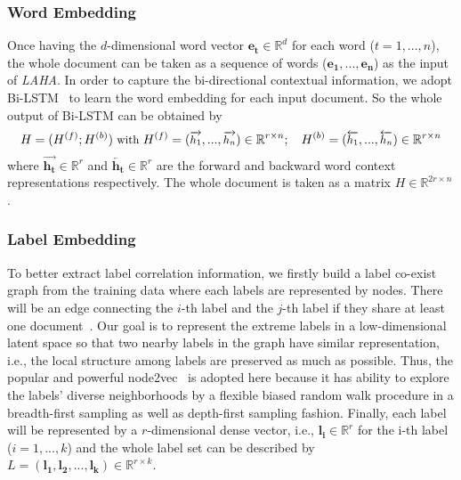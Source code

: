\documentclass[runningheads]{llncs}
\newenvironment{sequation}{\begin{equation}\small}{\end{equation}}
\begin{document}
\subsubsection{Word Embedding} 

Once having the $d$-dimensional word vector $\mathbf{{ e }_{ t }}\in { \mathbb{R} }^{ d }$ for each word ($t=1, ..., n$), the whole document can be taken as a sequence of words ($\mathbf{{ e }_1,...,e_n}$) as the input of \textit{LAHA}. In order to capture the bi-directional contextual information, we adopt Bi-LSTM~\cite{ref_article28} to learn the word embedding for each input document. So the whole output of Bi-LSTM can be obtained by 
\begin{sequation}
H = ({ H }^{ (f) };{ H }^{ (b) })  \text{ with } 
{ H }^{ (f) }=(\overrightarrow { { h }_{ 1 } } ,...,\overrightarrow { { h }_{ n } } ) \in { \mathbb{R} }^{ r \times n} ;\quad
{ H }^{ (b) }=(\overleftarrow { { h }_{ 1 } } ,...,\overleftarrow { { h }_{ n } } ) \in { \mathbb{R} }^{ r \times n}
\end{sequation}
where $\mathbf{\overrightarrow { { h }_{ t } }} \in { \mathbb{R} }^{ r }$ and $\mathbf{\overleftarrow { { h }_{ t } }} \in { \mathbb{R} }^{ r }$ are the forward and backward word context representations respectively.
The whole document is taken as a matrix $H\in { \mathbb{R} }^{ 2r \times n}$.



\vspace{-2mm}
\subsubsection{Label Embedding}




To better extract label correlation information, we firstly build a label co-exist graph from the training data where each labels are represented by nodes. There will be an edge connecting the $i$-th label and the $j$-th label if they share at least one document~\cite{ref_article15}. Our goal is to represent the extreme labels in a low-dimensional latent space so that two nearby labels in the graph have similar representation, i.e., the local structure among labels are preserved as much as possible. Thus, the popular and powerful node2vec~\cite{ref_article17} is adopted here because it has ability to explore the labels' diverse neighborhoods by a flexible biased random walk procedure in a breadth-first sampling as well as depth-first sampling fashion. Finally, each label will be represented by a $r$-dimensional dense vector, i.e., $\mathbf{{ l }_{ i }}\in { \mathbb{R} }^{ r }$ for the i-th label ($i=1, ..., k$) and the whole label set can be described by $L=(\mathbf{{ l }_{ 1 },{ l }_{ 2 }, ..., { l }_{ k }}) \in \mathbb{R}^{r\times k}$.
\end{document}

